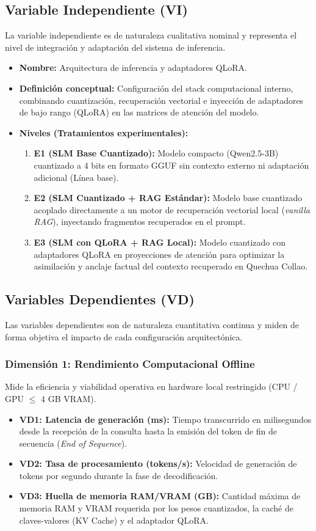 \documentclass[12pt]{article}
\begin{document}
\subsection{Variable Independiente (VI)}
La variable independiente es de naturaleza cualitativa nominal y representa el nivel de integración y adaptación del sistema de inferencia.
\begin{itemize}
    \item \textbf{Nombre:} Arquitectura de inferencia y adaptadores QLoRA.
    \item \textbf{Definición conceptual:} Configuración del stack computacional interno, combinando cuantización, recuperación vectorial e inyección de adaptadores de bajo rango (QLoRA) en las matrices de atención del modelo.
    \item \textbf{Niveles (Tratamientos experimentales):}
        \begin{enumerate}
            \item \textbf{E1 (SLM Base Cuantizado):} Modelo compacto (Qwen2.5-3B) cuantizado a 4 bits en formato GGUF sin contexto externo ni adaptación adicional (Línea base).
            \item \textbf{E2 (SLM Cuantizado + RAG Estándar):} Modelo base cuantizado acoplado directamente a un motor de recuperación vectorial local (\textit{vanilla RAG}), inyectando fragmentos recuperados en el prompt.
            \item \textbf{E3 (SLM con QLoRA + RAG Local):} Modelo cuantizado con adaptadores QLoRA en proyecciones de atención para optimizar la asimilación y anclaje factual del contexto recuperado en Quechua Collao.
        \end{enumerate}
\end{itemize}

\subsection{Variables Dependientes (VD)}
Las variables dependientes son de naturaleza cuantitativa continua y miden de forma objetiva el impacto de cada configuración arquitectónica.

\subsubsection{Dimensión 1: Rendimiento Computacional Offline}
Mide la eficiencia y viabilidad operativa en hardware local restringido (CPU / GPU $\le$ 4 GB VRAM).
\begin{itemize}
    \item \textbf{VD1: Latencia de generación (ms):} Tiempo transcurrido en milisegundos desde la recepción de la consulta hasta la emisión del token de fin de secuencia (\textit{End of Sequence}).
    \item \textbf{VD2: Tasa de procesamiento (tokens/s):} Velocidad de generación de tokens por segundo durante la fase de decodificación.
    \item \textbf{VD3: Huella de memoria RAM/VRAM (GB):} Cantidad máxima de memoria RAM y VRAM requerida por los pesos cuantizados, la caché de claves-valores (KV Cache) y el adaptador QLoRA.
\end{itemize}
\end{document}
